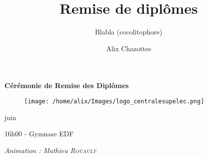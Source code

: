 \documentclass{beamer}
\title[Remise de diplômes]{Remise de diplômes}
\subtitle{Blabla (cocolitophore)}
\author{Alix Chazottes}
\institute{}
\begin{document}
\begin{frame}[plain]

  \begin{center}
    \vspace*{0.5cm}
    {\Large \textbf{Cérémonie de Remise des Diplômes}} \\
    \vspace*{0.3cm}
    {\large 
    \begin{figure}
      \texttt{[image: /home/alix/Images/logo\_centralesupelec.png]}
    \end{figure}
    
    \vspace*{0.5cm}
     juin  \\
    }
    
    \vspace*{0.3cm}
    16h00 - Gymnase EDF \\
    \vspace*{0.7cm}
    
    \textit{ Animation : Mathieu \textsc{Rouault}}
  \end{center}

\end{frame}


\end{document}
